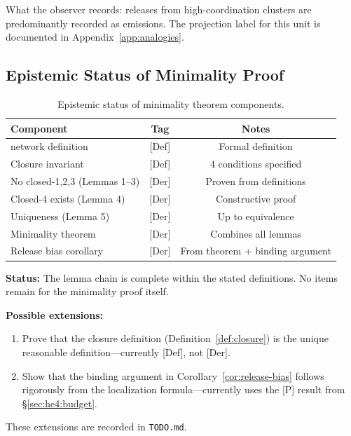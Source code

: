 \begin{observerbox}
What the observer records: releases from high-coordination clusters are
predominantly recorded as \ClosedFour{} emissions. The projection label
for this unit is documented in Appendix~\ref{app:analogies}.
\end{observerbox}

\subsection{Epistemic Status of Minimality Proof}
\label{sec:he4:min:epistemic}

\begin{table}[h]
\centering
\caption{Epistemic status of minimality theorem components.}
\label{tab:minimality_epistemic}
\begin{tabular}{p{5cm}cc}
    \toprule
    Component & Tag & Notes \\
    \midrule
    \Junction{} network definition & [Def] & Formal definition \\
    Closure invariant & [Def] & 4 conditions specified \\
    No closed-1,2,3 (Lemmas 1--3) & [Der] & Proven from definitions \\
    Closed-4 exists (Lemma 4) & [Der] & Constructive proof \\
    Uniqueness (Lemma 5) & [Der] & Up to equivalence \\
    Minimality theorem & [Der] & Combines all lemmas \\
    Release bias corollary & [Der] & From theorem + binding argument \\
    \bottomrule
\end{tabular}
\end{table}

\begin{edcopenbox}[title=Proof Obligations (if any gaps remain)]
    \textbf{Status:} The lemma chain is complete within the stated definitions.
    No \tagOpen{} items remain for the minimality proof itself.

    \textbf{Possible extensions:}
    \begin{enumerate}
        \item Prove that the closure definition (Definition~\ref{def:closure})
              is the unique reasonable definition---currently [Def], not [Der].
        \item Show that the binding argument in Corollary~\ref{cor:release-bias}
              follows rigorously from the localization formula---currently uses
              the [P] result from \S\ref{sec:he4:budget}.
    \end{enumerate}
    These extensions are recorded in \texttt{TODO.md}.
\end{edcopenbox}

